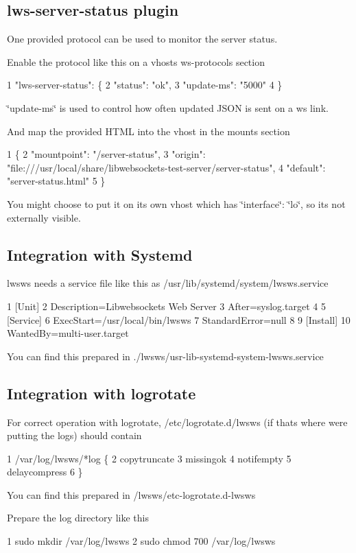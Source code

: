 \subsection*{lws-\/server-\/status plugin }

One provided protocol can be used to monitor the server status.

Enable the protocol like this on a vhost\textquotesingle{}s ws-\/protocols section 
\begin{DoxyCode}
1 "lws-server-status": \{
2   "status": "ok",
3   "update-ms": "5000"
4 \}
\end{DoxyCode}
 \char`\"{}update-\/ms\char`\"{} is used to control how often updated J\+S\+ON is sent on a ws link.

And map the provided H\+T\+ML into the vhost in the mounts section 
\begin{DoxyCode}
1 \{
2  "mountpoint": "/server-status",
3  "origin": "file:///usr/local/share/libwebsockets-test-server/server-status",
4  "default": "server-status.html"
5 \}
\end{DoxyCode}
 You might choose to put it on its own vhost which has \char`\"{}interface\char`\"{}\+: \char`\"{}lo\char`\"{}, so it\textquotesingle{}s not externally visible.

\subsection*{Integration with Systemd }

lwsws needs a service file like this as {\ttfamily /usr/lib/systemd/system/lwsws.service} 
\begin{DoxyCode}
1 [Unit]
2 Description=Libwebsockets Web Server
3 After=syslog.target
4 
5 [Service]
6 ExecStart=/usr/local/bin/lwsws
7 StandardError=null
8 
9 [Install]
10 WantedBy=multi-user.target
\end{DoxyCode}


You can find this prepared in {\ttfamily ./lwsws/usr-\/lib-\/systemd-\/system-\/lwsws.service}

\subsection*{Integration with logrotate }

For correct operation with logrotate, {\ttfamily /etc/logrotate.d/lwsws} (if that\textquotesingle{}s where we\textquotesingle{}re putting the logs) should contain 
\begin{DoxyCode}
1 /var/log/lwsws/*log \{
2     copytruncate
3     missingok
4     notifempty
5     delaycompress
6 \}
\end{DoxyCode}
 You can find this prepared in {\ttfamily /lwsws/etc-\/logrotate.d-\/lwsws}

Prepare the log directory like this


\begin{DoxyCode}
1 sudo mkdir /var/log/lwsws
2 sudo chmod 700 /var/log/lwsws
\end{DoxyCode}
 